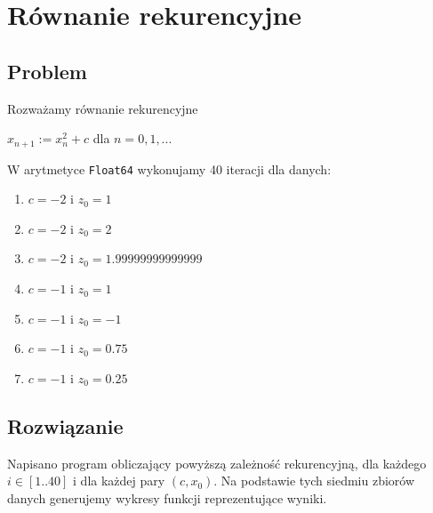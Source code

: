 \documentclass{article}
\begin{document}
    \section{Równanie rekurencyjne}
        \subsection{Problem}
            Rozważamy równanie rekurencyjne
            \begin{center}
                $x_{n+1} := x_{n}^2 + c$ dla $n = 0, 1, ...$
            \end{center}
            W arytmetyce \texttt{Float64} wykonujamy 40 iteracji dla danych:
            \begin{enumerate}
                \item $c = -2$ i $z_0 = 1$
                \item $c = -2$ i $z_0 = 2$
                \item $c = -2$ i $z_0 = 1.99999999999999$
                \item $c = -1$ i $z_0 = 1$
                \item $c = -1$ i $z_0 = -1$
                \item $c = -1$ i $z_0 = 0.75$
                \item $c = -1$ i $z_0 = 0.25$
            \end{enumerate}
        \subsection{Rozwiązanie}
            Napisano program obliczający powyższą zależność rekurencyjną, dla każdego $i \in [1..40]$ i dla każdej pary $(c, x_0)$. Na podstawie tych siedmiu zbiorów danych generujemy wykresy funkcji reprezentujące wyniki.
\end{document}
